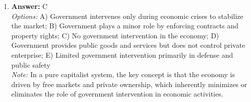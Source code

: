 \documentclass[12pt]{article}
\begin{document}
\begin{enumerate}[label=\arabic*.]
\\ \textit{Note:} According to Keynesian theory, changes in the money supply can influence interest rates and aggregate demand, thereby significantly affecting overall economic activity and output.
\item \textbf{Answer:} C
\\ \textit{Options:} A) Government intervenes only during economic crises to stabilize the market; B) Government plays a minor role by enforcing contracts and property rights; C) No government intervention in the economy; D) Government provides public goods and services but does not control private enterprise; E) Limited government intervention primarily in defense and public safety
\\ \textit{Note:} In a pure capitalist system, the key concept is that the economy is driven by free markets and private ownership, which inherently minimizes or eliminates the role of government intervention in economic activities.
\end{enumerate}
\end{document}
